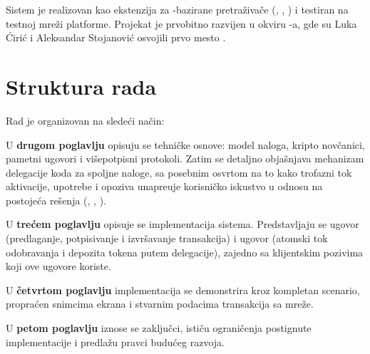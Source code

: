Sistem je realizovan kao ekstenzija za -bazirane pretra\v ziva\v ce (, , ) i testiran na  testnoj mre\v zi  platforme. Projekat je prvobitno razvijen u okviru  -a, gde su Luka \' Ciri\' c i Aleksandar Stojanovi\' c osvojili prvo mesto \cite{etherns2025}.

\section{Struktura rada}

Rad je organizovan na slede\' ci na\v cin:

U \textbf{drugom poglavlju} opisuju se tehni\v cke osnove:  model naloga, kripto nov\v canici, pametni ugovori i vi\v sepotpisni protokoli. Zatim se detaljno obja\v snjava  mehanizam delegacije koda za spoljne naloge, sa posebnim osvrtom na to kako trofazni tok aktivacije, upotrebe i opoziva unapre\dj uje korisni\v cko iskustvo u odnosu na postoje\' ca re\v senja (, , ).

U \textbf{tre\' cem poglavlju} opisuje se implementacija sistema. Predstavljaju se ugovor  (predlaganje, potpisivanje i izvr\v savanje transakcija) i ugovor  (atomski tok odobravanja i depozita  tokena putem  delegacije), zajedno sa klijentskim pozivima koji ove ugovore koriste.

U \textbf{\v cetvrtom poglavlju} implementacija se demonstrira kroz kompletan scenario, propra\' cen snimcima ekrana i stvarnim podacima transakcija sa  mre\v ze.

U \textbf{petom poglavlju} iznose se zaklju\v cci, isti\v cu ograni\v cenja postignute implementacije i predla\v zu pravci budu\' ceg razvoja.
